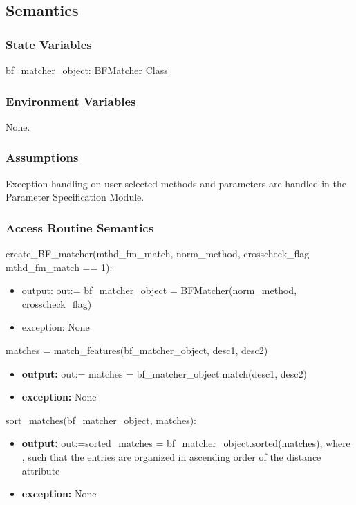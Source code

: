\documentclass[12pt, titlepage]{article}
\begin{document}
\subsection{Semantics}

\subsubsection{State Variables}
bf\_matcher\_object: \href{https://docs.opencv.org/3.4/d3/da1/classcv_1_1BFMatcher.html}{BFMatcher Class}

\subsubsection{Environment Variables}

None.

\subsubsection{Assumptions}

Exception handling on user-selected methods and parameters are handled in the Parameter 
Specification Module.

\subsubsection{Access Routine Semantics}

create\_BF\_matcher(mthd\_fm\_match, norm\_method, crosscheck\_flag 
\textbar \: mthd\_fm\_match == 1):
\begin{itemize}
  \item output: out:= bf\_matcher\_object = BFMatcher(norm\_method, 
  crosscheck\_flag) 
  \item exception: None
\end{itemize} 
matches = match\_features(bf\_matcher\_object, desc1, desc2) 
\begin{itemize}
  \item \textbf{output:} out:= matches = bf\_matcher\_object.match(desc1, desc2)
  \item \textbf{exception:} None
\end{itemize}
sort\_matches(bf\_matcher\_object, matches):
\begin{itemize}
  \item \textbf{output:} out:=sorted\_matches = bf\_matcher\_object.sorted(matches), where , such that the entries
  are organized in ascending order of the distance attribute
  \item \textbf{exception:} None
\end{itemize}
\end{document}

